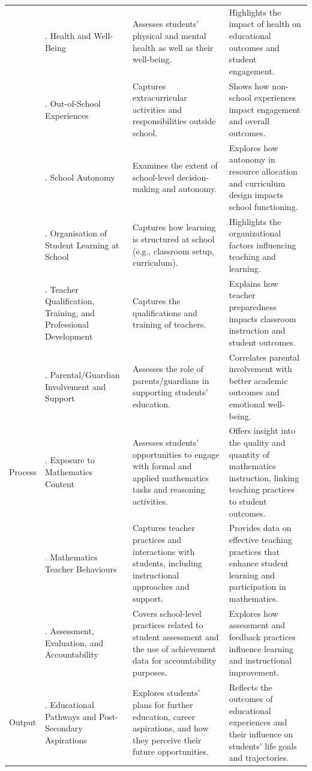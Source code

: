\documentclass[
]{article}
\begin{document}
\begin{longtable}[l]{>{\raggedright\arraybackslash}p{1.5cm}>{\raggedright\arraybackslash}p{3.5cm}>{\raggedright\arraybackslash}p{5cm}>{\raggedright\arraybackslash}p{5cm}}
 & 9. Health and Well-Being & Assesses students' physical and mental health as well as their well-being. & Highlights the impact of health on educational outcomes and student engagement.\\
\addlinespace
 & 10. Out-of-School Experiences & Captures extracurricular activities and responsibilities outside school. & Shows how non-school experiences impact engagement and overall outcomes.\\
 & 13. School Autonomy & Examines the extent of school-level decision-making and autonomy. & Explores how autonomy in resource allocation and curriculum design impacts school functioning.\\
 & 14. Organisation of Student Learning at School & Captures how learning is structured at school (e.g., classroom setup, curriculum). & Highlights the organizational factors influencing teaching and learning.\\
 & 17. Teacher Qualification, Training, and Professional Development & Captures the qualifications and training of teachers. & Explains how teacher preparedness impacts classroom instruction and student outcomes.\\
 & 19. Parental/Guardian Involvement and Support & Assesses the role of parents/guardians in supporting students' education. & Correlates parental involvement with better academic outcomes and emotional well-being.\\
\addlinespace
Process & 15. Exposure to Mathematics Content & Assesses students' opportunities to engage with formal and applied mathematics tasks and reasoning activities. & Offers insight into the quality and quantity of mathematics instruction, linking teaching practices to student outcomes.\\
 & 16. Mathematics Teacher Behaviours & Captures teacher practices and interactions with students, including instructional approaches and support. & Provides data on effective teaching practices that enhance student learning and participation in mathematics.\\
 & 18. Assessment, Evaluation, and Accountability & Covers school-level practices related to student assessment and the use of achievement data for accountability purposes. & Explores how assessment and feedback practices influence learning and instructional improvement.\\
Output & 3. Educational Pathways and Post-Secondary Aspirations & Explores students’ plans for further education, career aspirations, and how they perceive their future opportunities. & Reflects the outcomes of educational experiences and their influence on students’ life goals and trajectories.\\

\end{longtable}
\end{document}
